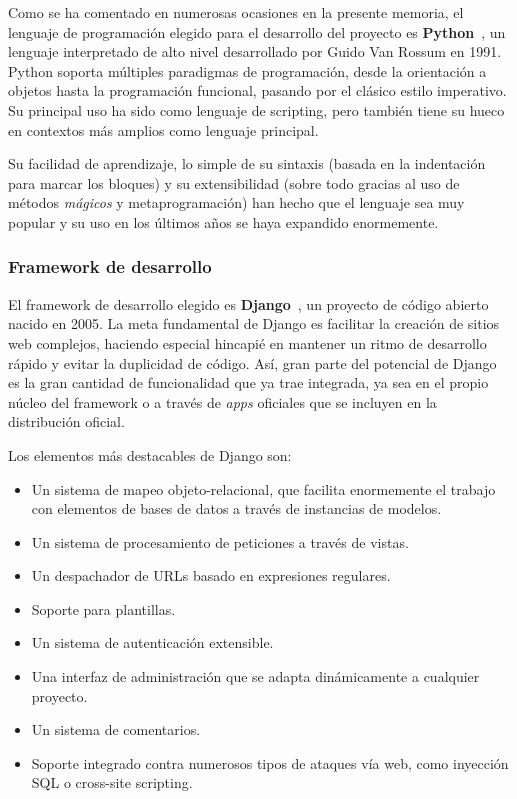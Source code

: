 Como se ha comentado en numerosas ocasiones en la presente memoria, el lenguaje
de programación elegido para el desarrollo del proyecto es
\textbf{Python}~\cite{Python}, un lenguaje interpretado de alto nivel
desarrollado por Guido Van Rossum en 1991. Python soporta múltiples paradigmas
de programación, desde la orientación a objetos hasta la programación funcional,
pasando por el clásico estilo imperativo. Su principal uso ha sido como lenguaje
de scripting, pero también tiene su hueco en contextos más amplios como lenguaje
principal.

Su facilidad de aprendizaje, lo simple de su sintaxis (basada en la indentación
para marcar los bloques) y su extensibilidad (sobre todo gracias al uso de
métodos \textit{mágicos} y metaprogramación) han hecho que el lenguaje sea muy
popular y su uso en los últimos años se haya expandido enormemente.

\subsubsection{Framework de desarrollo}

El framework de desarrollo elegido es \textbf{Django}~\cite{django}, un
proyecto de código abierto nacido en 2005. La meta fundamental de Django es
facilitar la creación de sitios web complejos, haciendo especial hincapié en
mantener un ritmo de desarrollo rápido y evitar la duplicidad de código. Así,
gran parte del potencial de Django es la gran cantidad de funcionalidad que ya
trae integrada, ya sea en el propio núcleo del framework o a través de
\textit{apps} oficiales que se incluyen en la distribución oficial.

Los elementos más destacables de Django son:

\begin{itemize}
\item Un sistema de mapeo objeto-relacional, que facilita enormemente el trabajo
  con elementos de bases de datos a través de instancias de modelos.
\item Un sistema de procesamiento de peticiones a través de vistas.
\item Un despachador de URLs basado en expresiones regulares.
\item Soporte para plantillas.
\item Un sistema de autenticación extensible.
\item Una interfaz de administración que se adapta dinámicamente a cualquier proyecto.
\item Un sistema de comentarios.
\item Soporte integrado contra numerosos tipos de ataques vía web, como
  inyección SQL o cross-site scripting.
\end{itemize}

